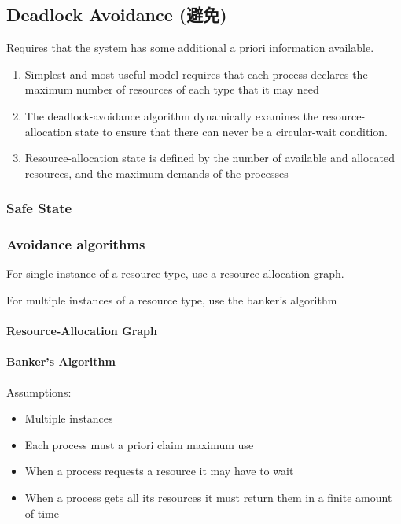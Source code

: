\subsection{Deadlock Avoidance (避免)}
Requires that the system has some additional a priori information available.
\begin{enumerate}\small
    \item Simplest and most useful model requires that each process declares the maximum number of resources of each type that it may need
    \item The deadlock-avoidance algorithm dynamically examines the resource-allocation state to ensure that there can never be a circular-wait condition.
    \item Resource-allocation state is defined by the number of available and allocated resources, and the maximum demands of the processes
\end{enumerate}

\subsubsection{Safe State}

\subsubsection{Avoidance algorithms}

For single instance of a resource type, use a resource-allocation graph.

For multiple instances of a resource type, use the banker's algorithm

\paragraph{Resource-Allocation Graph}

\paragraph{Banker's Algorithm}%
Assumptions:
\begin{itemize}\small
    \item Multiple instances
    \item Each process must a priori claim maximum use
    \item When a process requests a resource it may have to wait
    \item When a process gets all its resources it must return them in a finite amount of time
\end{itemize}

